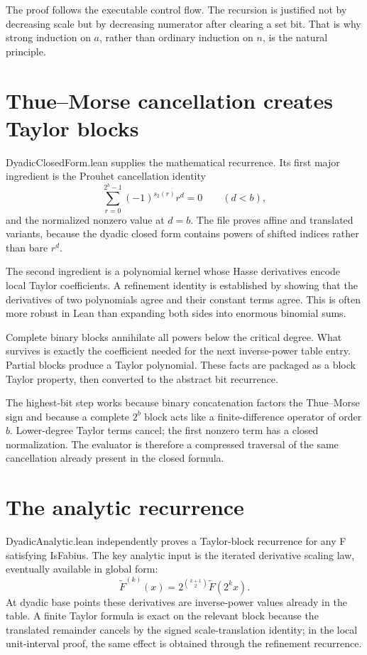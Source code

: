 \documentclass[11pt,a4paper,openany]{book}
\def\module#1{#1.lean}
\def\decl#1{#1}
\def\code#1{#1}
\newcommand{\module}[1]{\nolinkurl{#1.lean}}
\newcommand{\decl}[1]{\texttt{\detokenize{#1}}}
\newcommand{\code}[1]{\texttt{\detokenize{#1}}}
\begin{document}
The proof follows the executable control flow.  The recursion is justified not
by decreasing scale but by decreasing numerator after clearing a set bit.
That is why strong induction on $a$, rather than ordinary induction on $n$, is
the natural principle.

\section{Thue--Morse cancellation creates Taylor blocks}
\module{DyadicClosedForm} supplies the mathematical recurrence.  Its first
major ingredient is the Prouhet cancellation identity
\[
 \sum_{r=0}^{2^b-1}(-1)^{s_2(r)}r^d=0
 \qquad(d<b),
\]
and the normalized nonzero value at $d=b$.  The file proves affine and
translated variants, because the dyadic closed form contains powers of shifted
indices rather than bare $r^d$.

The second ingredient is a polynomial kernel whose Hasse derivatives encode
local Taylor coefficients.  A refinement identity is established by showing
that the derivatives of two polynomials agree and their constant terms agree.
This is often more robust in Lean than expanding both sides into enormous
binomial sums.

Complete binary blocks annihilate all powers below the critical degree.  What
survives is exactly the coefficient needed for the next inverse-power table
entry.  Partial blocks produce a Taylor polynomial.  These facts are packaged
as a block Taylor property, then converted to the abstract bit recurrence.

\begin{proofidea}
The highest-bit step works because binary concatenation factors the Thue--Morse
sign and because a complete $2^b$ block acts like a finite-difference operator
of order $b$.  Lower-degree Taylor terms cancel; the first nonzero term has a
closed normalization.  The evaluator is therefore a compressed traversal of
the same cancellation already present in the closed formula.
\end{proofidea}

\section{The analytic recurrence}
\module{DyadicAnalytic} independently proves a Taylor-block recurrence for any
\code{F} satisfying \decl{IsFabius}.  The key analytic input is the iterated
derivative scaling law, eventually available in global form:
\[
 \widetilde F^{(k)}(x)
 =2^{\binom{k+1}{2}}\widetilde F(2^k x).
\]
At dyadic base points these derivatives are inverse-power values already in the
table.  A finite Taylor formula is exact on the relevant block because the
translated remainder cancels by the signed scale-translation identity; in the
local unit-interval proof, the same effect is obtained through the refinement
recurrence.
\end{document}
